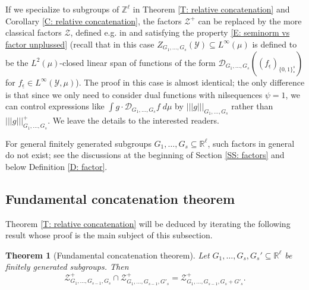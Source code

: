 \documentclass[11pt]{amsart}
\newtheorem{theorem}[lemma]{Theorem}
\theoremstyle{definition}
\newcommand{\R}{{\mathbb R}}
\newcommand{\Z}{{\mathbb Z}}
\newcommand{\CD}{{\mathcal D}}
\newcommand{\CY}{{\mathcal Y}}
\newcommand{\CZ}{{\mathcal Z}}
\newcommand{\ueps}{{\underline{\epsilon}}}
\newcommand{\nnorm}[1]{\lvert\!|\!| #1|\!|\!\rvert}
\newcommand{\1}{{\mathbf{1}}}
\begin{document}
 
If we specialize to subgroups of $\Z^\ell$ in Theorem \ref{T: relative concatenation} and Corollary \ref{C: relative concatenation}, the factors $\CZ^+$ can be replaced by the more classical factors $\CZ$, defined e.g. in \cite{HK05a, TZ16} and satisfying the property \eqref{E: seminorm vs factor unplussed} (recall that in this case  $Z_{G_1, \ldots, G_s}(\CY)\subseteq L^\infty(\mu)$ is defined to be the $L^2(\mu)$-closed linear span of functions of the form 
$\CD_{G_1, \ldots, G_s}((f_\ueps)_{\{0,1\}^s_*})$ for $f_\ueps\in L^\infty(\CY, \mu)$). The proof in this case is almost identical; the only difference is that since we only need to consider dual functions with nilsequences $\psi = 1$, we can control expressions like $\int g \cdot \CD_{G_1, \ldots, G_s}f\; d\mu$ by $\nnorm{g}_{G_1, \ldots, G_s}$ rather than $\nnorm{g}_{G_1, \ldots, G_s}^+$.  We leave the details to the interested readers.

For general finitely generated subgroups $G_1, \ldots, G_s\subseteq\R^\ell$, such factors in general do not exist; see the discussions at the beginning of Section \ref{SS: factors} and below Definition \ref{D: factor}.


\subsection{Fundamental concatenation theorem}

Theorem \ref{T: relative concatenation} will be deduced by iterating the following result whose proof is the main subject of this subsection.
\begin{theorem}[Fundamental concatenation theorem]\label{T: fundamental concatenation}
Let $G_1, \ldots, G_s, G_s'\subseteq\R^\ell$ be finitely generated subgroups.
Then $$\mathcal{Z}^+_{G_1,\dots,G_{s-1},G_s}\cap \mathcal{Z}^+_{G_1,\dots,G_{s-1},G'_s}=\mathcal{Z}^+_{G_1,\dots,G_{s-1},G_s+G'_s}.$$ 
\end{theorem}
\end{document}

